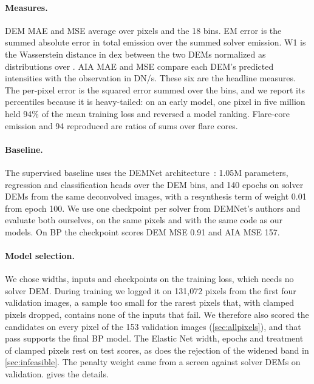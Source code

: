 \paragraph{Measures.}
DEM MAE and MSE average over pixels and the 18 bins. EM error is the summed absolute error in total emission over the summed solver emission. W1 is the Wasserstein distance in dex between the two DEMs normalized as distributions over \logT. AIA MAE and MSE compare each DEM's predicted intensities with the observation in DN/s. These six are the headline measures. The per-pixel error is the squared error summed over the bins, and we report its percentiles because it is heavy-tailed: on an early model, one pixel in five million held 94\% of the mean training loss and reversed a model ranking. Flare-core emission and 94\Ang{} reproduced are ratios of sums over flare cores.

\paragraph{Baseline.}
The supervised baseline uses the DEMNet architecture~\cite{perezdiaz2026demnet}: 1.05M parameters, regression and classification heads over the DEM bins, and 140 epochs on solver DEMs from the same deconvolved images, with a resynthesis term of weight 0.01 from epoch 100. We use one checkpoint per solver from DEMNet's authors and evaluate both ourselves, on the same pixels and with the same code as our models. On BP the checkpoint scores DEM MSE 0.91 and AIA MSE 157.

\paragraph{Model selection.}
We chose widths, inputs and checkpoints on the training loss, which needs no solver DEM. During training we logged it on 131,072 pixels from the first four validation images, a sample too small for the rarest pixels that, with clamped pixels dropped, contains none of the inputs that fail. We therefore also scored the candidates on every pixel of the 153 validation images (\cref{sec:allpixels}), and that pass supports the final BP model. The Elastic Net width, epochs and treatment of clamped pixels rest on test scores, as does the rejection of the widened band in \cref{sec:infeasible}. The penalty weight came from a screen against solver DEMs on validation.  gives the details.
